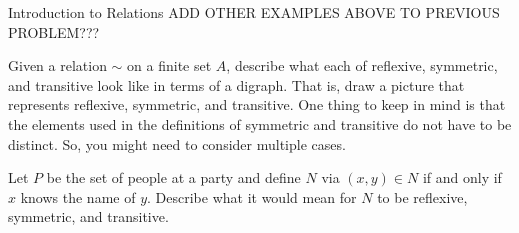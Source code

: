 \begin{section}{Introduction to Relations}
ADD OTHER EXAMPLES ABOVE TO PREVIOUS PROBLEM???

\begin{problem}
Given a relation $\sim$ on a finite set $A$, describe what each of reflexive, symmetric, and transitive look like in terms of a digraph. That is, draw a picture that represents reflexive, symmetric, and transitive. One thing to keep in mind is that the elements used in the definitions of symmetric and transitive do not have to be distinct.  So, you might need to consider multiple cases.
\end{problem}

\begin{problem}
Let $P$ be the set of people at a party and define $N$ via $(x,y)\in N$ if and only if $x$ knows the name of $y$.  Describe what it would mean for $N$ to be reflexive, symmetric, and transitive.
\end{problem}


\end{section}
